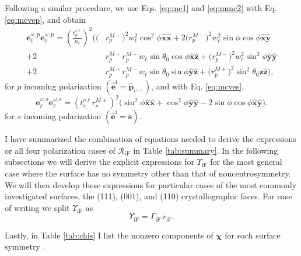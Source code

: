 Following a similar procedure, we use Eqs. \eqref{eq:mc1} and \eqref{eq:mmc2}
with Eq. \eqref{eq:mcvep}, and obtain
\begin{equation}\label{eq:ewewpmr}
\begin{split}
\mathbf{e}^{\omega,\mathrm{p}}_{\ell}\mathbf{e}^{\omega,\mathrm{p}}_{\ell} =
\left(\frac{t^{v\ell}_{p}}{n_{\ell}}\right)^{2}
\bigg(
  \big(&r^{M-}_{p}\big)^{2}w^{2}_{\ell}\cos^{2}\phi
  \hat{\mathbf{x}}\hat{\mathbf{x}}
+ 2\big(r^{M-}_{p}\big)^{2}w^{2}_{\ell}\sin\phi\cos\phi
  \hat{\mathbf{x}}\hat{\mathbf{y}}\\
+ 2&r^{M+}_{p}r^{M-}_{p}w_{\ell}\sin\theta_{0}\cos\phi
  \hat{\mathbf{x}}\hat{\mathbf{z}}
+ \big(r^{M-}_{p}\big)^{2}w^{2}_{\ell}\sin^{2}\phi
  \hat{\mathbf{y}}\hat{\mathbf{y}}\\
+ 2&r^{M+}_{p}r^{M-}_{p}w_{\ell}\sin\theta_{0}\sin\phi
  \hat{\mathbf{y}}\hat{\mathbf{z}}
+ \big(r^{M+}_{p}\big)^{2}\sin^{2}\theta_{0}
   \hat{\mathbf{z}}\hat{\mathbf{z}}
\bigg),
\end{split}
\end{equation}
for $p$ incoming polarization $(\hat{\mathbf{e}}^{\mathrm{i}} =
\hat{\mathbf{p}}_{v-})$, and with Eq. \eqref{eq:mcves},
\begin{equation}\label{eq:ewewsmr}
\mathbf{e}^{\omega,\mathrm{s}}_{\ell}\mathbf{e}^{\omega,\mathrm{s}}_{\ell}
= \left(t^{v\ell}_{s}r^{M+}_{s}\right)^{2}
\big(
  \sin^{2}\phi\hat{\mathbf{x}}\hat{\mathbf{x}}
 + \cos^{2}\phi\hat{\mathbf{y}}\hat{\mathbf{y}}
 - 2\sin\phi\cos\phi\hat{\mathbf{x}}\hat{\mathbf{y}}
\big).
\end{equation}
for $s$ incoming polarization $(\hat{\mathbf{e}}^{\mathrm{i}} =
\hat{\mathbf{s}})$.

I have summarized the combination of equations needed to derive the expressions
or all four polarization cases of $\mathcal{R}_{\mathrm{iF}}$ in Table
\ref{tab:summary}. In the following subsections we will derive the explicit
expressions for $\Upsilon_{\mathrm{iF}}$ for the most general case where the
surface has no symmetry other than that of noncentrosymmetry. We will then
develop these expressions for particular cases of the most commonly investigated
surfaces, the (111), (001), and (110) crystallographic faces. For ease of
writing we split $\Upsilon_{\mathrm{iF}}$ as
\begin{equation}\label{eq:mc25}
\Upsilon_{\mathrm{iF}} = \Gamma_{\mathrm{iF}}\,r_{\mathrm{iF}}.
\end{equation} 

Lastly, in Table \ref{tab:chis} I list the nonzero components of
$\boldsymbol{\chi}$ for each surface symmetry \cite{sipePRB87, popovbook}.

